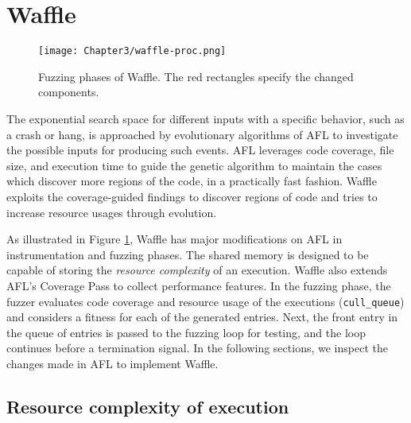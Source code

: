 \section{Waffle}
\label{sec:3-instr}



\begin{figure}[!t]
  \texttt{[image: Chapter3/waffle-proc.png]}
  \centering
  \caption{Fuzzing phases of Waffle. The red rectangles specify the changed components.}
  \label{fig:waffle-phases}
\end{figure}

The exponential search space for different inputs with a specific behavior, such as a crash or hang, is approached by evolutionary algorithms of AFL to investigate the possible inputs for producing such events. AFL leverages code coverage, file size, and execution time to guide the genetic algorithm to maintain the cases which discover more regions of the code, in a practically fast fashion. Waffle exploits the coverage-guided findings to discover regions of code and tries to increase resource usages through evolution.


As illustrated in Figure \ref{fig:waffle-phases}, Waffle has major modifications on AFL in instrumentation and fuzzing phases. The shared memory is designed to be capable of storing the \textit{resource complexity} of an execution. Waffle also extends AFL's Coverage Pass to collect performance features. In the fuzzing phase, the fuzzer evaluates code coverage and resource usage of the executions (\texttt{cull\_queue}) and considers a fitness for each of the generated entries. Next, the front entry in the queue of entries is passed to the fuzzing loop for testing, and the loop continues before a termination signal. In the following sections, we inspect the changes made in AFL to implement Waffle.

\subsection{Resource complexity of execution}

